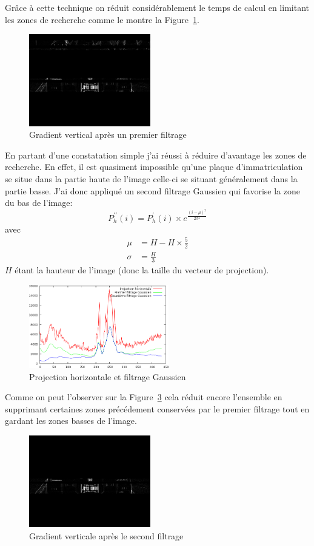 \documentclass[a4paper,10pt,twocolumn]{article}
\begin{document}
Grâce à cette technique on réduit considérablement le temps de calcul en limitant les zones de recherche comme le montre la Figure~\ref{v_filter}.
\begin{figure}[H]
	\centering 
	  \includegraphics[width=200px]{img/991213-006_v_filter_1-2.png}
	\caption{Gradient vertical après un premier filtrage\label{v_filter}}
\end{figure}
En partant d'une constatation simple j'ai réussi à réduire d'avantage les zones de recherche. En effet, il est quasiment impossible qu'une plaque d'immatriculation se situe dans la partie haute de l'image celle-ci se situant généralement dans la partie basse. J'ai donc appliqué un second filtrage Gaussien qui favorise la zone du bas de l'image:
\begin{equation}
  P_h^{\prime\prime}(i) = P_h^{\prime}(i) \times e^{\frac{(i - \mu)^2}{2\sigma^2}}
\end{equation}
avec 
\begin{align*}
  \mu & = H - H\times \frac{5}{2}\\
  \sigma & = \frac{H}{3}
\end{align*}
$H$ étant la hauteur de l'image (donc la taille du vecteur de projection).

\begin{figure}[H]
	\centering 
	  \includegraphics[width=230px]{img/project_h_gauss.png}
	\caption{Projection horizontale et filtrage Gaussien\label{h_proj_gauss}}
\end{figure}

Comme on peut l'observer sur la Figure~\ref{v_filter_gauss} cela réduit encore l'ensemble en supprimant certaines zones précédement conservées par le premier filtrage tout en gardant les zones basses de l'image.
\begin{figure}[H]
	\centering 
	  \includegraphics[width=200px]{img/991213-006_v_filter_gauss.png}
	\caption{Gradient verticale après le second filtrage\label{v_filter_gauss}}
\end{figure}
\end{document}
